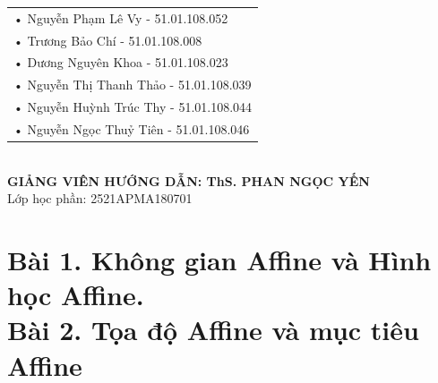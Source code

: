 \documentclass[12pt,a4paper]{article}
\begin{document}
\begin{center}
\begin{minipage}{0.9\textwidth}
\begin{center}
\vspace{0.2cm}

\begin{tabular}{l}
• Nguyễn Phạm Lê Vy - 51.01.108.052 \\
• Trương Bảo Chí - 51.01.108.008 \\
• Dương Nguyên Khoa - 51.01.108.023 \\
• Nguyễn Thị Thanh Thảo - 51.01.108.039\\
• Nguyễn Huỳnh Trúc Thy - 51.01.108.044\\
• Nguyễn Ngọc Thuỷ Tiên - 51.01.108.046
\end{tabular} \\[12pt]

\textbf{GIẢNG VIÊN HƯỚNG DẪN: ThS. PHAN NGỌC YẾN}\\[6pt]
Lớp học phần: 2521APMA180701

\end{center}

\vspace{10pt}

\end{minipage}
\end{center}


\newpage
\pagestyle{fancy}

\tableofcontents
\newpage

\section{Bài 1. Không gian Affine và Hình học Affine. \\[4pt] Bài 2. Tọa độ Affine và mục tiêu Affine}
\end{document}
